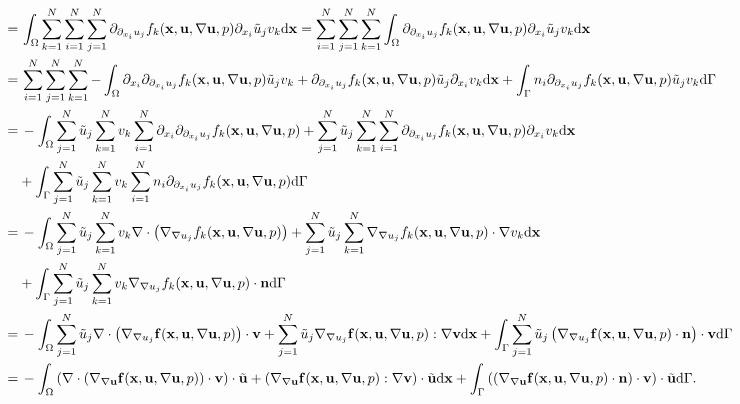 \documentclass[oneside,11pt]{book}
\numberwithin{equation}{section}
\begin{document}
\begin{enumerate}[leftmargin=0in]
\begin{align*}
        =&\, \int_\Omega \sum_{k=1}^N\sum_{i=1}^N\sum_{j=1}^N \partial_{\partial_{x_i}u_j}f_k({\bf x},{\bf u},\nabla{\bf u},p)\partial_{x_i}\tilde{u}_jv_k{\rm d}{\bf x} = \sum_{i=1}^N\sum_{j=1}^N\sum_{k=1}^N \int_\Omega \partial_{\partial_{x_i}u_j}f_k({\bf x},{\bf u},\nabla{\bf u},p)\partial_{x_i}\tilde{u}_jv_k{\rm d}{\bf x}\\
        =&\, \sum_{i=1}^N\sum_{j=1}^N\sum_{k=1}^N -\int_\Omega \partial_{x_i}\partial_{\partial_{x_i}u_j}f_k({\bf x},{\bf u},\nabla{\bf u},p)\tilde{u}_jv_k + \partial_{\partial_{x_i}u_j}f_k({\bf x},{\bf u},\nabla{\bf u},p)\tilde{u}_j\partial_{x_i}v_k{\rm d}{\bf x} + \int_\Gamma n_i\partial_{\partial_{x_i}u_j}f_k({\bf x},{\bf u},\nabla{\bf u},p)\tilde{u}_jv_k{\rm d}\Gamma\\
        =&\, -\int_\Omega \sum_{j=1}^N \tilde{u}_j\sum_{k=1}^N v_k\sum_{i=1}^N \partial_{x_i}\partial_{\partial_{x_i}u_j}f_k({\bf x},{\bf u},\nabla{\bf u},p) + \sum_{j=1}^N \tilde{u}_j\sum_{k=1}^N\sum_{i=1}^N \partial_{\partial_{x_i}u_j}f_k({\bf x},{\bf u},\nabla{\bf u},p)\partial_{x_i}v_k{\rm d}{\bf x}\\
        &+ \int_\Gamma \sum_{j=1}^N \tilde{u}_j\sum_{k=1}^N v_k\sum_{i=1}^N n_i\partial_{\partial_{x_i}u_j}f_k({\bf x},{\bf u},\nabla{\bf u},p){\rm d}\Gamma\\
        =&\, - \int_\Omega \sum_{j=1}^N \tilde{u}_j\sum_{k=1}^N v_k\nabla\cdot\left(\nabla_{\nabla u_j}f_k({\bf x},{\bf u},\nabla{\bf u},p)\right) + \sum_{j=1}^N \tilde{u}_j\sum_{k=1}^N \nabla_{\nabla u_j}f_k({\bf x},{\bf u},\nabla{\bf u},p)\cdot\nabla v_k{\rm d}{\bf x}\\
        &+ \int_\Gamma \sum_{j=1}^N \tilde{u}_j\sum_{k=1}^N v_k\nabla_{\nabla u_j}f_k({\bf x},{\bf u},\nabla{\bf u},p)\cdot{\bf n}{\rm d}\Gamma\\
        =&\, -\int_\Omega \sum_{j=1}^N \tilde{u}_j\nabla\cdot\left(\nabla_{\nabla u_j}{\bf f}({\bf x},{\bf u},\nabla{\bf u},p)\right)\cdot{\bf v} + \sum_{j=1}^N \tilde{u}_j\nabla_{\nabla u_j}{\bf f}({\bf x},{\bf u},\nabla{\bf u},p):\nabla{\bf v}{\rm d}{\bf x} + \int_\Gamma \sum_{j=1}^N \tilde{u}_j\left(\nabla_{\nabla u_j}{\bf f}({\bf x},{\bf u},\nabla{\bf u},p)\cdot{\bf n}\right)\cdot{\bf v}{\rm d}\Gamma\\
        =&\, -\int_\Omega \left(\nabla\cdot\left(\nabla_{\nabla{\bf u}}{\bf f}({\bf x},{\bf u},\nabla{\bf u},p)\right)\cdot{\bf v}\right)\cdot\tilde{\bf u} + \left(\nabla_{\nabla{\bf u}}{\bf f}({\bf x},{\bf u},\nabla{\bf u},p):\nabla{\bf v}\right)\cdot\tilde{\bf u}{\rm d}{\bf x} + \int_\Gamma \left(\left(\nabla_{\nabla{\bf u}}{\bf f}({\bf x},{\bf u},\nabla{\bf u},p)\cdot{\bf n}\right)\cdot{\bf v}\right)\cdot\tilde{\bf u}{\rm d}\Gamma.

\end{align*}
\end{enumerate}
\end{document}
